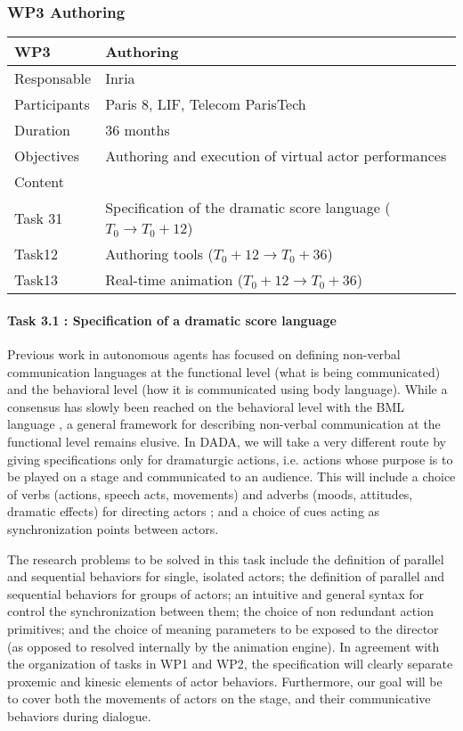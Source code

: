 \subsubsection{WP3 Authoring}


\begin{center}
\begin{tabular}{|l|l|}\hline
WP3 &  Authoring \\\hline
Responsable &  Inria  \\\hline
Participants &  Paris 8, LIF, Telecom ParisTech\\\hline
Duration  &   36 months \\\hline
Objectives &  Authoring and execution of virtual actor performances  \\\hline
Content &  \\\hline
Task 31 & Specification of the dramatic score language  ($T_0 \rightarrow  T_0+12$)  \\\hline
Task12 &  Authoring tools  ($T_0+12 \rightarrow  T_0+36$)  \\\hline
Task13 &  Real-time animation   ($T_0+12 \rightarrow  T_0+36$)  \\\hline
\end{tabular}
\end{center}


\paragraph{Task 3.1 : Specification of a dramatic score language}

Previous work in autonomous agents has focused on defining non-verbal communication languages at the functional level (what is being communicated) and the behavioral level (how it is communicated using body language). While a consensus has slowly been reached on the behavioral level with the BML language \cite{Kopp2006}, a general framework for describing non-verbal communication at the functional level remains elusive. In DADA, we will take a very different route by giving specifications only for dramaturgic actions, i.e. actions whose purpose is to be played on a stage and communicated to an audience. This will include a choice of verbs (actions, speech acts, movements) and adverbs (moods, attitudes, dramatic effects)  for directing actors ; and a choice of cues acting as synchronization points between actors.

The research problems to be solved in this task include the definition of parallel and sequential behaviors for single, isolated actors; the definition of parallel and sequential behaviors for groups of actors; an intuitive and general  syntax for control the synchronization between them; the choice of non redundant action primitives; and the choice of meaning parameters to be exposed to the director (as opposed to resolved internally by the animation engine). In agreement with the organization of tasks in WP1 and WP2, the specification will clearly separate proxemic and kinesic elements of actor behaviors. Furthermore,  our goal will be to cover both the movements of actors on the stage, and their communicative behaviors during dialogue. 


